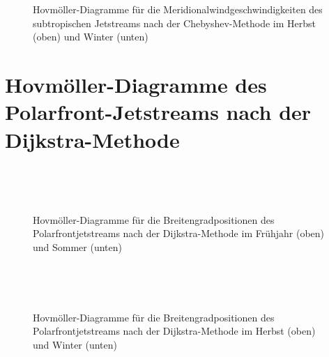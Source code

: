 \begin{figure}
  \centering
  \begin{minipage}{\textwidth}
    \centering
  \end{minipage} \\ 
    \begin{minipage}{\textwidth}
      \centering
  \end{minipage} \\ 
  \caption[Hovmöllerdiagramme des Meridionalwinds des Subtropenjets nach Chebyshev im Herbst und Winter]{Hovmöller-Diagramme für die Meridionalwindgeschwindigkeiten des subtropischen Jetstreams nach der Chebyshev-Methode im Herbst (oben) und Winter (unten)}
\end{figure}



\newpage
\section{Hovmöller-Diagramme des Polarfront-Jetstreams nach der Dijkstra-Methode} 

\begin{figure} %
  \centering
  \begin{minipage}{\textwidth}
  \end{minipage} \\ 
    \begin{minipage}{\textwidth}
  \end{minipage} \\ 
  \caption[Hovmöllerdiagramme der Positionen des Polarfrontjets nach Dijkstra im Frühjahr und Sommer]{Hovmöller-Diagramme für die Breitengradpositionen des Polarfrontjetstreams nach der Dijkstra-Methode im Frühjahr (oben) und Sommer (unten)} 
\end{figure}

\begin{figure}
  \centering
  \begin{minipage}{\textwidth}
  \end{minipage} \\ 
    \begin{minipage}{\textwidth}
  \end{minipage} \\ 
  \caption[Hovmöllerdiagramme der Positionen des Polarfrontjets nach Dijkstra im Herbst und Winter]{Hovmöller-Diagramme für die Breitengradpositionen des Polarfrontjetstreams nach der Dijkstra-Methode im Herbst (oben) und Winter (unten)}
\end{figure}

